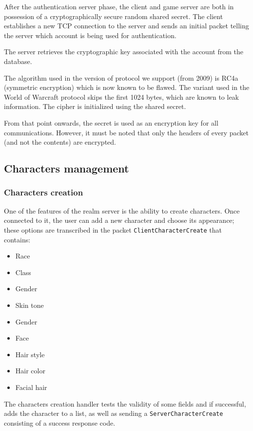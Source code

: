 \documentclass[paper=a4, fontsize=11pt]{scrartcl}
\begin{document}
After the authentication server phase, the client and game server are both in
possession of a cryptographically secure random shared secret.
The client establishes a new TCP connection to the server and sends an initial
packet telling the server which account is being used for authentication.

The server retrieves the cryptographic key associated with the account from the
database.

The algorithm used in the version of protocol we support (from
2009) is RC4a (symmetric encryption) which is now known to be flawed.
The variant used in the World of Warcraft protocol skips the first 1024 bytes,
which are known to leak information.
The cipher is initialized using the shared secret.

From that point onwards, the secret is used as an encryption key for all
communications.
However, it must be noted that only the headers of every packet
(and not the contents) are encrypted.

\subsection{Characters management}
\subsubsection{Characters creation}
One of the features of the realm server is the ability to create characters.
Once connected to it, the user can add a new character and choose its appearance; 
these options are transcribed in the packet \texttt{ClientCharacterCreate} that
contains:
\begin{multicols}{2}
\begin{itemize}
    \item Race
    \item Class
    \item Gender
    \item Skin tone
    \item Gender
    \item Face
    \item Hair style
    \item Hair color
    \item Facial hair
\end{itemize}
\end{multicols}

The characters creation handler tests the validity of some fields and if successful,
adds the character to a list, as well as sending a \texttt{ServerCharacterCreate}
consisting of a success response code.
\end{document}
